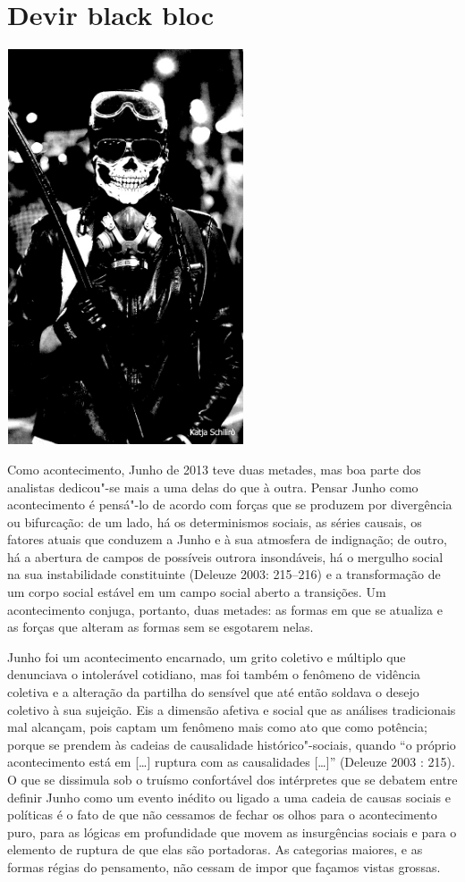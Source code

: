\chapter{Devir black bloc}

\begin{center}
\includegraphics[width=7cm,height=11.7cm]{Imgs/img12.jpg}
\end{center}

Como acontecimento, Junho de 2013 teve duas metades, mas boa parte dos
analistas dedicou"-se mais a uma delas do que à outra. Pensar Junho como
acontecimento é pensá"-lo de acordo com forças que se produzem por
divergência ou bifurcação: de um lado, há os determinismos sociais, as
séries causais, os fatores atuais que conduzem a Junho e à sua atmosfera
de indignação; de outro, há a abertura de campos de possíveis outrora
insondáveis, há o mergulho social na sua instabilidade constituinte
(Deleuze 2003: 215--216) e a transformação de um corpo social estável em
um campo social aberto a transições. Um acontecimento conjuga, portanto,
duas metades: as formas em que se atualiza e as forças que alteram as
formas sem se esgotarem nelas.

Junho foi um acontecimento encarnado, um grito coletivo e múltiplo que
denunciava o intolerável cotidiano, mas foi também o fenômeno de
vidência coletiva e a alteração da partilha do sensível que até então
soldava o desejo coletivo à sua sujeição. Eis a dimensão afetiva e
social que as análises tradicionais mal alcançam, pois captam um
fenômeno mais como ato que como potência; porque se prendem às cadeias
de causalidade histórico"-sociais, quando ``o próprio acontecimento está
em {[}\ldots{}{]} ruptura com as causalidades {[}\ldots{}{]}'' (Deleuze 2003
: 215). O que se dissimula sob o truísmo confortável dos intérpretes que
se debatem entre definir Junho como um evento inédito ou ligado a uma
cadeia de causas sociais e políticas é o fato de que não cessamos de
fechar os olhos para o acontecimento puro, para as lógicas em
profundidade que movem as insurgências sociais e para o elemento de
ruptura de que elas são portadoras. As categorias maiores, e as formas
régias do pensamento, não cessam de impor que façamos vistas grossas.

